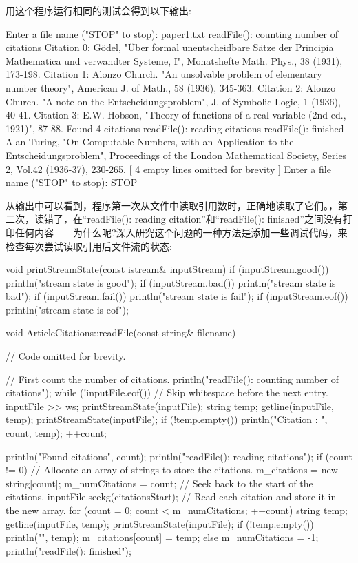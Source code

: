 用这个程序运行相同的测试会得到以下输出:

\begin{shell}
Enter a file name ("STOP" to stop): paper1.txt
readFile(): counting number of citations
Citation 0: Gödel, "Über formal unentscheidbare Sätze der Principia Mathematica und
verwandter Systeme, I", Monatshefte Math. Phys., 38 (1931), 173-198.
Citation 1: Alonzo Church. "An unsolvable problem of elementary number theory",
American J. of Math., 58 (1936), 345-363.
Citation 2: Alonzo Church. "A note on the Entscheidungsproblem", J. of Symbolic
Logic, 1 (1936), 40-41.
Citation 3: E.W. Hobson, "Theory of functions of a real variable (2nd ed.,
1921)", 87-88.
Found 4 citations
readFile(): reading citations
readFile(): finished
Alan Turing, "On Computable Numbers, with an Application to the
Entscheidungsproblem", Proceedings of the London Mathematical Society, Series 2,
Vol.42 (1936-37), 230-265.
[ 4 empty lines omitted for brevity ]
Enter a file name ("STOP" to stop): STOP
\end{shell}

从输出中可以看到，程序第一次从文件中读取引用数时，正确地读取了它们。，第二次，读错了，在“readFile(): reading citation”和“readFile(): finished”之间没有打印任何内容——为什么呢?深入研究这个问题的一种方法是添加一些调试代码，来检查每次尝试读取引用后文件流的状态:

\begin{cpp}
void printStreamState(const istream& inputStream)
{
    if (inputStream.good()) { println("stream state is good"); }
    if (inputStream.bad()) { println("stream state is bad"); }
    if (inputStream.fail()) { println("stream state is fail"); }
    if (inputStream.eof()) { println("stream state is eof"); }
}

void ArticleCitations::readFile(const string& filename)
{
    // Code omitted for brevity.

    // First count the number of citations.
    println("readFile(): counting number of citations");
    while (!inputFile.eof()) {
        // Skip whitespace before the next entry.
        inputFile >> ws;
        printStreamState(inputFile);
        string temp;
        getline(inputFile, temp);
        printStreamState(inputFile);
        if (!temp.empty()) {
            println("Citation {}: {}", count, temp);
            ++count;
        }
    }

    println("Found {} citations", count);
    println("readFile(): reading citations");
    if (count != 0) {
        // Allocate an array of strings to store the citations.
        m_citations = new string[count];
        m_numCitations = count;
        // Seek back to the start of the citations.
        inputFile.seekg(citationsStart);
        // Read each citation and store it in the new array.
        for (count = 0; count < m_numCitations; ++count) {
            string temp;
            getline(inputFile, temp);
            printStreamState(inputFile);
            if (!temp.empty()) {
                println("{}", temp);
                m_citations[count] = temp;
            }
        }
    } else {
        m_numCitations = -1;
    }
    println("readFile(): finished");
}
\end{cpp}

